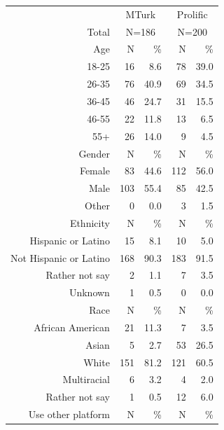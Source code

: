\documentclass[a4paper,notitlepage,12pt]{article}
\begin{document}
\begin{table}[!h]
\centering
\small
\setlength{\tabcolsep}{15pt}
\begin{tabular}{ rrrrr }
\toprule
& \multicolumn{2}{c}{MTurk} & \multicolumn{2}{c}{Prolific} \\
\cmidrule(lr){2-3} \cmidrule(lr){4-5}
Total & \multicolumn{2}{c}{N=186} & \multicolumn{2}{c}{N=200} \\
\midrule
Age & N & \% & N & \% \\
\cmidrule(lr){1-5}
18-25   &      16 &   8.6 &       78 &  39.0 \\
26-35   &      76 &  40.9 &       69 &  34.5 \\
36-45   &      46 &  24.7 &       31 &  15.5 \\
46-55   &      22 &  11.8 &       13 &   6.5 \\
55+     &      26 &  14.0 &        9 &   4.5 \\
\midrule
Gender & N & \% & N & \% \\
\cmidrule(lr){1-5}
Female             &    83 &  44.6 &    112 &  56.0 \\
Male               &   103 &  55.4 &     85 &  42.5 \\
Other              &     0 &   0.0 &      3 &   1.5 \\
\midrule
Ethnicity & N & \% & N & \% \\
\cmidrule(lr){1-5}
Hispanic or Latino     &    15 &   8.1 &     10 &   5.0 \\
Not Hispanic or Latino &   168 &  90.3 &    183 &  91.5 \\
Rather not say         &     2 &   1.1 &      7 &   3.5 \\
Unknown                &     1 &   0.5 &      0 &   0.0 \\
\midrule
Race & N & \% & N & \% \\
\cmidrule(lr){1-5}
African American                 &    21 &  11.3 &      7 &   3.5 \\
Asian                                     &     5 &   2.7 &     53 &  26.5 \\
White                                     &   151 &  81.2 &    121 &  60.5 \\
Multiracial                               &     6 &   3.2 &      4 &   2.0 \\
Rather not say                            &     1 &   0.5 &     12 &   6.0 \\
\midrule
Use other platform & N & \% & N & \% \\
\cmidrule(lr){1-5}

\end{tabular}
\end{table}
\end{document}
